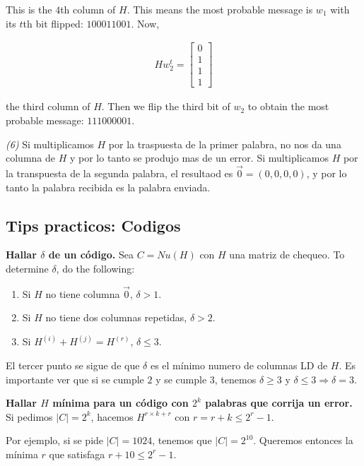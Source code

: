 \documentclass[a4paper]{article}
\begin{document}
This is the $4$th column of $H$. This means the most probable message is $w_1$ with its 
$t$th bit flipped: $100011001$. Now, 

\begin{align*}
    Hw_2^t = \begin{bmatrix} 
            0\\ 1 \\ 1 \\ 1 
    \end{bmatrix} 
\end{align*}

the third column of $H$. Then we flip the third bit of $w_2$ to obtain the most probable 
message: $111000001$.

\textit{(6)} Si multiplicamos $H$ por la traspuesta de la primer palabra, no nos da una columna de $H$ y por lo tanto se produjo mas de un error. Si multiplicamos $H$ por la transpuesta de la segunda palabra, el resultaod es $\overrightarrow{0} = (0, 0, 0, 0)$, y por lo tanto la palabra recibida es la palabra enviada.

\pagebreak

\subsection{Tips practicos: Codigos}

\textbf{Hallar $\delta$ de un código.} Sea $C = Nu(H)$ con $H$ una matriz de
chequeo. To determine $\delta$, do the following: 

\begin{enumerate}
    \item Si $H$ no tiene columna $\overrightarrow{0}$, $\delta > 1$.
    \item Si $H$ no tiene dos columnas repetidas, $\delta > 2$.
    \item Si $H^{(i)} + H^{(j)} = H^{(r)}$, $\delta \leq 3$.
\end{enumerate}

El tercer punto se sigue de que $\delta$ es el mínimo numero de columnas LD de
$H$. Es importante ver que si se cumple $2$ y se cumple $3$, tenemos $\delta
\geq 3$ y $\delta \leq 3 \Rightarrow \delta = 3$.

\textbf{Hallar $H$ mínima para un código con $2^k$ palabras que corrija un
error.} Si pedimos $|C| = 2^k$, hacemos $H^{r\times k+r}$ con $r = r + k \leq
2^r - 1$. 

Por ejemplo, si se pide $|C| = 1024$, tenemos que $|C| = 2^{10}$. Queremos entonces la mínima $r$ que satisfaga $r + 10 \leq 2^r - 1$.
\end{document}
